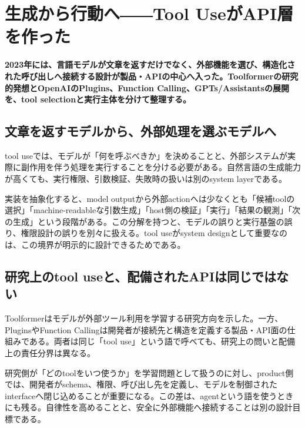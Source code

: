 \section{生成から行動へ――Tool UseがAPI層を作った}
\noindent\textbf{2023年には、言語モデルが文章を返すだけでなく、外部機能を選び、構造化された呼び出しへ接続する設計が製品・APIの中心へ入った。Toolformerの研究的発想とOpenAIのPlugins、Function Calling、GPTs/Assistantsの展開を、tool selectionと実行主体を分けて整理する。}\autocite{src-150e07b331df,src-4de1cea0a896,src-6b76b870b4ae,src-97786632d087,src-e17d0bf10781}

\subsection{文章を返すモデルから、外部処理を選ぶモデルへ}

tool useでは、モデルが「何を呼ぶべきか」を決めることと、外部システムが実際に副作用を伴う処理を実行することを分ける必要がある。自然言語の生成能力が高くても、実行権限、引数検証、失敗時の扱いは別のsystem layerである。\autocite{src-150e07b331df,src-4de1cea0a896,src-6b76b870b4ae,src-97786632d087,src-e17d0bf10781}


実装を抽象化すると、model outputから外部actionへは少なくとも「候補toolの選択」「machine-readableな引数生成」「host側の検証」「実行」「結果の観測」「次の生成」という段階がある。この分解を持つと、モデルの誤りと実行基盤の誤り、権限設計の誤りを別々に扱える。tool useがsystem designとして重要なのは、この境界が明示的に設計できるためである。\autocite{src-150e07b331df,src-4de1cea0a896,src-6b76b870b4ae,src-97786632d087,src-e17d0bf10781}


\subsection{研究上のtool useと、配備されたAPIは同じではない}

Toolformerはモデルが外部ツール利用を学習する研究方向を示した。一方、PluginsやFunction Callingは開発者が接続先と構造を定義する製品・API面の仕組みである。両者は同じ「tool use」という語で呼べても、研究上の問いと配備上の責任分界は異なる。\autocite{src-150e07b331df,src-4de1cea0a896,src-6b76b870b4ae,src-97786632d087,src-e17d0bf10781}


研究側が「どのtoolをいつ使うか」を学習問題として扱うのに対し、product側では、開発者がschema、権限、呼び出し先を定義し、モデルを制御されたinterfaceへ閉じ込めることが重要になる。この差は、agentという語を使うときにも残る。自律性を高めることと、安全に外部機能へ接続することは別の設計目標である。\autocite{src-150e07b331df,src-4de1cea0a896,src-6b76b870b4ae,src-97786632d087,src-e17d0bf10781}


